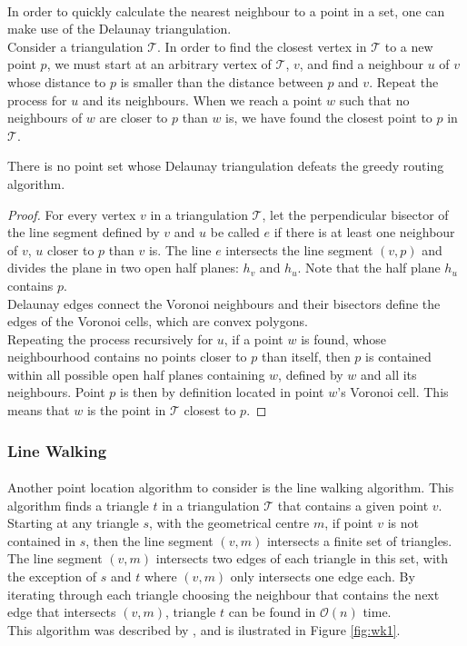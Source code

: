 \paragraph{}
In order to quickly calculate the nearest neighbour to a point in a set, one can make use of the Delaunay triangulation.\\
Consider a triangulation $\mathcal{T}$. In order to find the closest vertex in $\mathcal{T}$ to a new point $p$, we must start at an arbitrary vertex of $\mathcal{T}$, $v$, and find a neighbour $u$ of $v$ whose distance to $p$ is smaller than the distance between $p$ and $v$. Repeat the process for $u$ and its neighbours. When we reach a point $w$ such that no neighbours of $w$ are closer to $p$ than $w$ is, we have found the closest point to $p$ in $\mathcal{T}$.

\begin{theorem}
There is no point set whose Delaunay triangulation defeats the greedy routing algorithm.
\begin{proof}
For every vertex $v$ in a triangulation $\mathcal{T}$, let the perpendicular bisector of the line segment defined by $v$ and $u$ be called $e$ if there is at least one neighbour of $v$, $u$ closer to $p$ than $v$ is. The line $e$ intersects the line segment $(v,p)$ and divides the plane in two open half planes: $h_v$ and $h_u$. Note that the half plane $h_u$ contains $p$.\\
Delaunay edges connect the Voronoi neighbours and their bisectors define the edges of the Voronoi cells, which are convex polygons.\\
Repeating the process recursively for $u$, if a point $w$ is found, whose neighbourhood contains no points closer to $p$ than itself, then $p$ is contained within all possible open half planes containing $w$, defined by $w$ and all its neighbours. Point $p$ is then by definition located in point $w$'s Voronoi cell. This means that $w$ is the point in $\mathcal{T}$ closest to $p$.
\end{proof}
\end{theorem}
\subsubsection{Line Walking}
\paragraph{}
Another point location algorithm to consider is the line walking algorithm. This algorithm finds a triangle $t$ in a triangulation $\mathcal{T}$ that contains a given point $v$. \\
Starting at any triangle $s$, with the geometrical centre $m$, if point $v$ is not contained in $s$, then the line segment $(v,m)$ intersects a finite set of triangles.  
The line segment $(v,m)$ intersects two edges of each triangle in this set, with the exception of $s$ and $t$ where $(v,m)$ only intersects one edge each. 
By iterating through each triangle choosing the neighbour that contains the next edge that intersects $(v,m)$, triangle $t$ can be found in $\mathcal{O}(n)$ time.\\
This algorithm was described by \citet{walking}, and is ilustrated in Figure \ref*{fig:wk1}.

